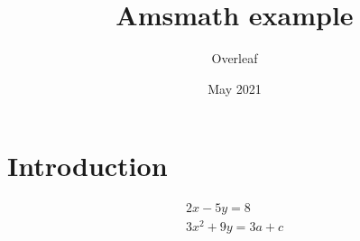 \documentclass{article}
\title{Amsmath example}
\author{Overleaf}
\date{May 2021}
\begin{document}
\maketitle
\section{Introduction}
\begin{gather*} 
2x - 5y =  8 \\ 
3x^2 + 9y =  3a + c
\end{gather*}
\end{document}

